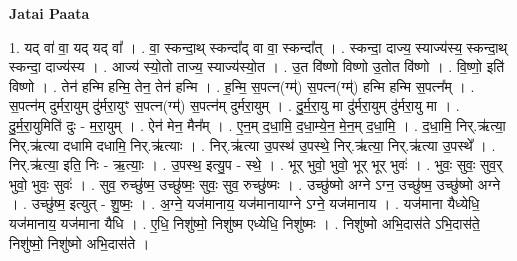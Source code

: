 \documentclass[17pt]{extarticle}
\begin{document}
\textbf{Jatai Paata} \newline

1. यद् वा॑ वा॒ यद् यद् वा᳚ । . वा॒ स्कन्दा॒थ् स्कन्दा᳚द् वा वा॒ स्कन्दा᳚त् । . स्कन्दा॒ दाज्य॒ स्याज्य॑स्य॒ स्कन्दा॒थ् स्कन्दा॒ दाज्य॑स्य । . आज्य॑ स्यो॒तो ताज्य॒ स्याज्य॑स्यो॒त । . उ॒त वि॑ष्णो विष्णो उ॒तोत वि॑ष्णो । . वि॒ष्णो॒ इति॑ विष्णो । . तेन॑ हन्मि हन्मि॒ तेन॒ तेन॑ हन्मि । . ह॒न्मि॒ स॒पत्न(ग्म्॑) स॒पत्न(ग्म्॑) हन्मि हन्मि स॒पत्न᳚म् । . स॒पत्न॑म् दुर्मरा॒युम् दु॑र्मरा॒युꣳ स॒पत्न(ग्म्॑) स॒पत्न॑म् दुर्मरा॒युम् । . दु॒र्म॒रा॒यु मा दु॑र्मरा॒युम् दु॑र्मरा॒यु मा । . दु॒र्म॒रा॒युमिति॑ दुः - म॒रा॒युम् । . ऐन॑ मेन॒ मैन᳚म् । . ए॒न॒म् द॒धा॒मि॒ द॒धा॒म्ये॒न॒ मे॒न॒म् द॒धा॒मि॒ । . द॒धा॒मि॒ निर्.ऋ॑त्या॒ निर्.ऋ॑त्या दधामि दधामि॒ निर्.ऋ॑त्याः । . निर्.ऋ॑त्या उ॒पस्थ॑ उ॒पस्थे॒ निर्.ऋ॑त्या॒ निर्.ऋ॑त्या उ॒पस्थे᳚ । . निर्.ऋ॑त्या॒ इति॒ निः - ऋ॒त्याः॒ । . उ॒पस्थ॒ इत्यु॒प - स्थे॒ । . भूर् भुवो॒ भुवो॒ भूर् भूर् भुवः॑ । . भुवः॒ सुवः॒ सुव॒र् भुवो॒ भुवः॒ सुवः॑ । . सुव॒ रुच्छु॑ष्म॒ उच्छु॑ष्मः॒ सुवः॒ सुव॒ रुच्छु॑ष्मः । . उच्छु॑ष्मो अग्ने ऽग्न॒ उच्छु॑ष्म॒ उच्छु॑ष्मो अग्ने । . उच्छु॑ष्म॒ इत्युत् - शु॒ष्मः॒ । . अ॒ग्ने॒ यज॑मानाय॒ यज॑मानायाग्ने ऽग्ने॒ यज॑मानाय । . यज॑माना यैध्येधि॒ यज॑मानाय॒ यज॑माना यैधि । . ए॒धि॒ निशु॑ष्मो॒ निशु॑ष्म एध्येधि॒ निशु॑ष्मः । . निशु॑ष्मो अभि॒दास॑ते ऽभि॒दास॑ते॒ निशु॑ष्मो॒ निशु॑ष्मो अभि॒दास॑ते । \newline
\end{document}
